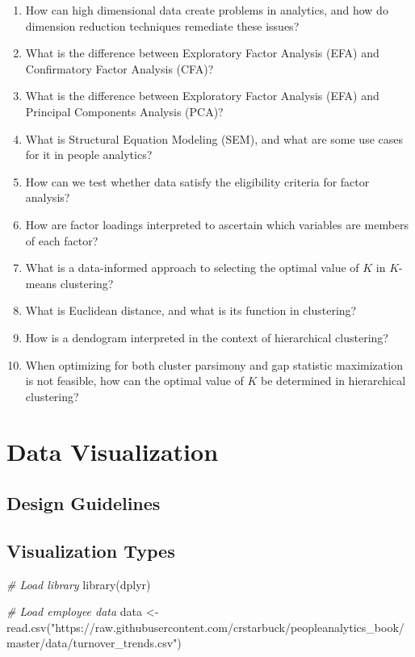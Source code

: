 \documentclass[
]{book}
\newenvironment{Shaded}{\begin{snugshade}}{\end{snugshade}}
\newcommand{\CommentTok}[1]{\textcolor[rgb]{0.56,0.35,0.01}{\textit{#1}}}
\newcommand{\FunctionTok}[1]{\textcolor[rgb]{0.00,0.00,0.00}{#1}}
\newcommand{\NormalTok}[1]{#1}
\newcommand{\OtherTok}[1]{\textcolor[rgb]{0.56,0.35,0.01}{#1}}
\newcommand{\StringTok}[1]{\textcolor[rgb]{0.31,0.60,0.02}{#1}}
\begin{document}
\begin{enumerate}
\def\labelenumi{\arabic{enumi}.}
\item
  How can high dimensional data create problems in analytics, and how do dimension reduction techniques remediate these issues?
\item
  What is the difference between Exploratory Factor Analysis (EFA) and Confirmatory Factor Analysis (CFA)?
\item
  What is the difference between Exploratory Factor Analysis (EFA) and Principal Components Analysis (PCA)?
\item
  What is Structural Equation Modeling (SEM), and what are some use cases for it in people analytics?
\item
  How can we test whether data satisfy the eligibility criteria for factor analysis?
\item
  How are factor loadings interpreted to ascertain which variables are members of each factor?
\item
  What is a data-informed approach to selecting the optimal value of \(K\) in \(K\)-means clustering?
\item
  What is Euclidean distance, and what is its function in clustering?
\item
  How is a dendogram interpreted in the context of hierarchical clustering?
\item
  When optimizing for both cluster parsimony and gap statistic maximization is not feasible, how can the optimal value of \(K\) be determined in hierarchical clustering?
\end{enumerate}

\hypertarget{data-viz}{%
\chapter{Data Visualization}\label{data-viz}}

\hypertarget{design-guidelines}{%
\section{Design Guidelines}\label{design-guidelines}}

\hypertarget{visualization-types}{%
\section{Visualization Types}\label{visualization-types}}

\begin{Shaded}
\begin{Highlighting}[]
\CommentTok{\# Load library}
\FunctionTok{library}\NormalTok{(dplyr)}

\CommentTok{\# Load employee data}
\NormalTok{data }\OtherTok{\textless{}{-}} \FunctionTok{read.csv}\NormalTok{(}\StringTok{"https://raw.githubusercontent.com/crstarbuck/peopleanalytics\_book/master/data/turnover\_trends.csv"}\NormalTok{)}
\end{Highlighting}
\end{Shaded}
\end{document}
